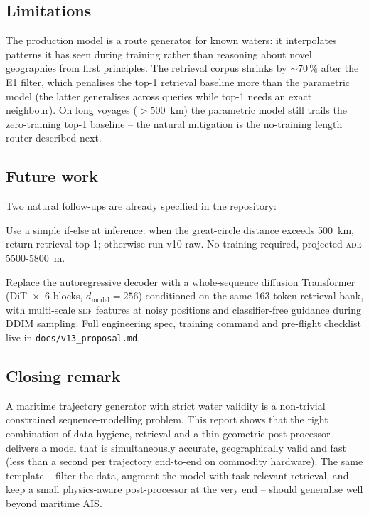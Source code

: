 \documentclass[11pt,a4paper]{article}
\newcommand{\ade}{\textsc{ade}}
\newcommand{\sdf}{\textsc{sdf}}
\newcommand{\code}[1]{\texttt{\small #1}}
\begin{document}
\subsection{Limitations}

The production model is a route generator for known waters: it
interpolates patterns it has seen during training rather than reasoning
about novel geographies from first principles.
The retrieval corpus shrinks by $\sim$70\,\% after the E1 filter, which
penalises the top-1 retrieval baseline more than the parametric model
(the latter generalises across queries while top-1 needs an exact
neighbour).
On long voyages ($>$500~km) the parametric model still trails the
zero-training top-1 baseline -- the natural mitigation is the
no-training length router described next.

\subsection{Future work}

Two natural follow-ups are already specified in the repository:

\begin{description}[leftmargin=*,style=nextline]
  \item[v13a -- length-conditioned router.]
        Use a simple if-else at inference: when the great-circle
        distance exceeds 500~km, return retrieval top-1; otherwise run
        v10 raw.  No training required, projected \ade{} 5500-5800~m.
  \item[v13b -- TrajDiff.]
        Replace the autoregressive decoder with a whole-sequence
        diffusion Transformer (DiT~$\times$~6 blocks, $d_{\mathrm{model}}
        = 256$) conditioned on the same 163-token retrieval bank, with
        multi-scale \sdf{} features at noisy positions and
        classifier-free guidance during DDIM sampling.  Full engineering
        spec, training command and pre-flight checklist live in
        \code{docs/v13\_proposal.md}.
\end{description}

\subsection{Closing remark}

A maritime trajectory generator with strict water validity is a
non-trivial constrained sequence-modelling problem.  This report shows
that the right combination of data hygiene, retrieval and a thin
geometric post-processor delivers a model that is simultaneously
accurate, geographically valid and fast (less than a second per
trajectory end-to-end on commodity hardware).  The same template --
filter the data, augment the model with task-relevant retrieval, and
keep a small physics-aware post-processor at the very end -- should
generalise well beyond maritime AIS.
\end{document}
